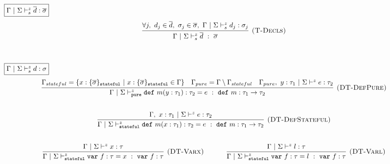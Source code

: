 \documentclass{llncs}
\newcommand{\keywadj}[1]{\mathtt{#1}}
\newcommand{\keyw}[1]{\keywadj{#1}~}
\begin{document}
$\fbox{$\Gamma~|~\Sigma \vdash^z_s \overline{d} : \overline{\sigma}$}$
\[
\begin{array}{c}
\infer[\textsc{(T-Decls)}]
  {\Gamma~|~\Sigma \vdash^z_{s} \overline{d}~:~\overline{\sigma}}
  {\forall j,~d_j \in \overline{d},~\sigma_{j} \in \overline{\sigma},~\Gamma~|~\Sigma \vdash^z_{s} d_j : \sigma_{j}}\\[5ex]

\end{array}
\]

$\fbox{$\Gamma~|~\Sigma \vdash^z_s d : \sigma$}$
\[
\begin{array}{c}


  
\infer[\textsc{(DT-DefPure)}]
  {\Gamma~|~\Sigma \vdash^z_{\keywadj{pure}} \keyw{def} m(y : \tau_1) : \tau_2 = e~:~\keyw{def} m : \tau_1 \rightarrow \tau_2}
  {\Gamma_{stateful} = \{x : \{ \overline{\sigma} \}_{\keywadj{stateful}} ~|~ x : \{ \overline{\sigma} \}_{\keywadj{stateful}} \in \Gamma\} & \Gamma_{pure} = \Gamma \setminus \Gamma_{stateful} & \Gamma_{pure},~y : \tau_1~|~\Sigma \vdash^z e : \tau_2}\\[5ex]

\infer[\textsc{(DT-DefStateful)}]
  {\Gamma~|~\Sigma \vdash^z_{\keywadj{stateful}} \keyw{def} m(x : \tau_1) : \tau_2 = e~:~\keyw{def} m : \tau_1 \rightarrow \tau_2}
  {\Gamma,~x : \tau_1~|~\Sigma \vdash^z e : \tau_2}\\[5ex]

\infer[\textsc{(DT-Varx)}]
  {\Gamma~|~\Sigma \vdash^z_{\keywadj{stateful}} \keyw{var} f : \tau = x~:~\keyw{var} f : \tau}
  {\Gamma~|~\Sigma \vdash^z x : \tau}%
~~~~~~~~~~
\infer[\textsc{(DT-Varl)}]
  {\Gamma~|~\Sigma \vdash^z_{\keywadj{stateful}} \keyw{var} f : \tau = l~:~\keyw{var} f : \tau}
  {\Gamma~|~\Sigma \vdash^z l : \tau}\\[5ex]

\end{array}
\]
\end{document}
